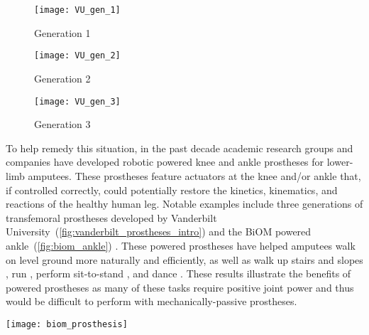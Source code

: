 \begin{figure*}[b]
    \centering
	\begin{subfigure}[b]{0.3\textwidth}
    	\centering
        \texttt{[image: VU\_gen\_1]}
        \caption{Generation 1}
	\end{subfigure}
	\begin{subfigure}[b]{0.3\textwidth}
    	\centering
        \texttt{[image: VU\_gen\_2]}
        \caption{Generation 2}
	\end{subfigure}
	\begin{subfigure}[b]{0.3\textwidth}
    	\centering
        \texttt{[image: VU\_gen\_3]}
        \caption{Generation 3}
	\end{subfigure}
    \caption[Vanderbilt University's Robotic Transfemoral Prostheses]{Vanderbilt
    University's Robotic Transfemoral Prostheses. Images courtesy of Michael
    Goldfarb.\vspace{0.1in}}\label{fig:vanderbilt_prostheses_intro}
\end{figure*}

To help remedy this situation, in the past decade academic research groups and
companies have developed robotic powered knee and ankle prostheses for
lower-limb amputees.  These prostheses feature actuators at the knee and/or
ankle that, if controlled correctly, could potentially restore the kinetics,
kinematics, and reactions of the healthy human leg. Notable examples include
three generations of transfemoral prostheses developed by Vanderbilt
University~(\cref{fig:vanderbilt_prostheses_intro}) \citep{sup2009preliminary,
lawson2013control, lawson2014robotic} and the BiOM powered
ankle~(\cref{fig:biom_ankle}) \citep{herr2012bionic}. These powered prostheses
have helped amputees walk on level ground more naturally and efficiently, as
well as walk up stairs and slopes \citep{sup2011upslope, lawson2013control}, run
\citep{huff2012running, shultz2015running}, perform sit-to-stand
\citep{varol2009powered}, and dance \citep{rouse2015design}. These results
illustrate the benefits of powered prostheses as many of these tasks require
positive joint power and thus would be difficult to perform with
mechanically-passive prostheses.

\begin{marginfigure}
    \centering
    \texttt{[image: biom\_prosthesis]}
    \caption[BiOM Robotic Ankle Prosthesis]{BiOM Robotic Ankle Prosthesis. Photo
    by \href{https://www.flickr.com/photos/jurvetson/13480667874/}{Steve
    Jurvetson}, \href{http://creativecommons.org/licenses/by/2.0}{CC BY 2.0},
    \href{https://commons.wikimedia.org/w/index.php?curid=32568854}{Link}
    (cropped from original).}\label{fig:biom_ankle}
\end{marginfigure}
